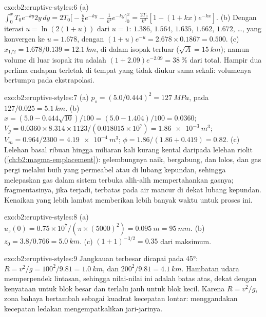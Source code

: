 \begin{solution}{exo:b2:eruptive-styles:6}
(a) $\int_0^x T_0e^{-ky}2y\,dy = 2T_0\big[-\tfrac{y}{k}e^{-ky} - \tfrac{1}{k^2}e^{-ky}\big]_0^x
= \tfrac{2T_0}{k^2}[1 - (1 + kx)e^{-kx}]$. (b) Dengan iterasi $u = \ln(2(1 + u))$ dari
$u = 1$: $1.386$, $1.564$, $1.635$, $1.662$, $1.672$, \dots, yang konvergen ke
$u = 1.678$, dengan $(1 + u)e^{-u} = 2.678\times0.1867 = 0.500$. (c) $x_{1/2} =
1.678/0.139 = \qty{12.1}{km}$, di dalam isopak terluar ($\sqrt A =
\qty{15}{km}$); namun volume di luar isopak itu adalah $(1 + 2.09)e^{-2.09} =
\qty{38}{\percent}$ dari total. Hampir dua perlima endapan terletak di tempat yang
tidak diukur sama sekali: volumenya bertumpu pada ekstrapolasi.
\end{solution}

\begin{solution}{exo:b2:eruptive-styles:7}
(a) $p_s = (5.0/0.444)^2 = \qty{127}{MPa}$, pada $127/0.025 = \qty{5.1}{km}$.
(b) $x = (5.0 - 0.444\sqrt{10})/100 = (5.0 - 1.404)/100 = 0.0360$;
$V_g = 0.0360\times8.314\times1123/(0.018015\times10^7) = \qty{1.86e-3}{m^3}$;
$V_m = 0.964/2300 = \qty{4.19e-4}{m^3}$; $\phi = 1.86/(1.86 + 0.419) = 0.82$.
(c) Lelehan basal ribuan hingga miliaran kali kurang kental daripada lelehan
riolit (\cref{ch:b2:magma-emplacement}): gelembungnya naik,
bergabung, dan lolos, dan gas pergi melalui buih yang permeabel atau di lubang
kepundan, sehingga  melepaskan gas dalam sistem terbuka alih-alih mempertahankan gasnya;
fragmentasinya, jika terjadi, terbatas pada air mancur di dekat lubang kepundan. Kenaikan yang lebih lambat
memberikan lebih banyak waktu untuk proses ini.
\end{solution}

\begin{solution}{exo:b2:eruptive-styles:8}
(a) $u_z(0) = 0.75\times10^7/(\pi\times(5000)^2) = \qty{0.095}{m} = \qty{95}{mm}$.
(b) $z_0 = 3.8/0.766 = \qty{5.0}{km}$. (c) $(1 + 1)^{-3/2} = 0.35$ dari
maksimum.
\end{solution}

\begin{solution}{exo:b2:eruptive-styles:9}
Jangkauan terbesar dicapai pada \ang{45}: $R = v^2/g = 100^2/9.81 = \qty{1.0}{km}$, dan
$200^2/9.81 = \qty{4.1}{km}$. Hambatan udara memperpendek lintasan, sehingga nilai-nilai ini adalah
batas atas, dekat dengan kenyataan untuk blok besar dan terlalu jauh untuk blok kecil.
Karena $R = v^2/g$, zona bahaya bertambah sebagai kuadrat kecepatan lontar:
menggandakan kecepatan ledakan mengempatkalikan jari-jarinya.
\end{solution}

